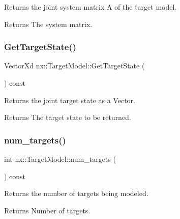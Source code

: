 Returns the joint system matrix A of the target model. \begin{DoxyReturn}{Returns}
The system matrix. 
\end{DoxyReturn}
\mbox{\label{classnx_1_1TargetModel_afbdd3abdce59717ddfa16b70808178ca}} 
\subsubsection{\texorpdfstring{Get\+Target\+State()}{GetTargetState()}}
{\footnotesize\ttfamily Vector\+Xd nx\+::\+Target\+Model\+::\+Get\+Target\+State (\begin{DoxyParamCaption}{ }\end{DoxyParamCaption}) const\hspace{0.3cm}{\ttfamily [inline]}}

Returns the joint target state as a Vector. \begin{DoxyReturn}{Returns}
The target state to be returned. 
\end{DoxyReturn}
\mbox{\label{classnx_1_1TargetModel_a269a926fe7a0fc4eae2416f4f0837f94}} 
\subsubsection{\texorpdfstring{num\+\_\+targets()}{num\_targets()}}
{\footnotesize\ttfamily int nx\+::\+Target\+Model\+::num\+\_\+targets (\begin{DoxyParamCaption}{ }\end{DoxyParamCaption}) const\hspace{0.3cm}{\ttfamily [inline]}}

Returns the number of targets being modeled. \begin{DoxyReturn}{Returns}
Number of targets. 
\end{DoxyReturn}
\mbox{\label{classnx_1_1TargetModel_a106254c8b6d05f241ab029ed7f534ea9}} 
